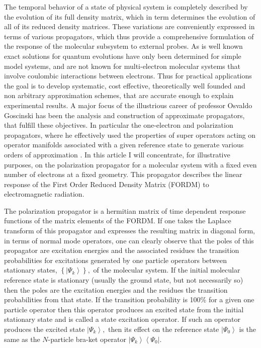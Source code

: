 \documentclass[aps,preprint]{revtex4}%
\begin{document}
The temporal behavior of a state of physical system is completely described by
the evolution of its full density matrix, which in term determines the
evolution of all of its reduced density matrices. These variations are
conveniently expressed in terms of various propagators, which thus provide a
comprehensive formulation of the response of the molecular subsystem to
external probes. As is well known exact solutions for quantum evolutions have
only been determined for simple model systems, and are not known for
multi-electron molecular systems that involve coulombic interactions between
electrons. Thus for practical applications the goal is to develop systematic,
cost effective, theoretically well founded and non arbitrary approximation
schemes, that are accurate enough to explain experimental results. A major
focus of the illustrious career of professor Osvaldo Goscinski has been the
analysis and construction of approximate propagators, that fulfill these
objectives. In particular the one-electron and polarization propagators, where
he effectively used the properties of super operators acting on operator
manifolds associated with a given reference state to generate various orders
of approximation \cite{Goscinski73}\cite{Pickup73}\cite{Goscinski69}%
\cite{Goscinski70}\cite{Weiner80a}\cite{Goscinski80}\cite{Howat77a}. In this
article I will concentrate, for illustrative purposes, on the polarization
propagator for a molecular system with a fixed even number of electrons at a
fixed geometry. This propagator describes the linear response of the First
Order Reduced Density Matrix (FORDM) to electromagnetic radiation.

The polarization propagator is a hermitian matrix of time dependent response
functions of the matrix elements of the FORDM. If one takes the Laplace
transform of this propagator and expresses the resulting matrix in diagonal
form, in terms of normal mode operators, one can clearly observe that the
poles of this propagator are excitation energies and the associated residues
the transition probabilities for excitations generated by one particle
operators between stationary states, $\left\{  \left\vert \Psi_{k}%
\right\rangle \right\}  ,$ of the molecular system. If the initial molecular
reference state is stationary (usually the ground state, but not necessarily
so) then the poles are the excitation energies and the residues the transition
probabilities from that state. If the transition probability is 100\% for a
given one particle operator then this operator produces an excited state from
the initial stationary state and is called a state excitation operator. If
such an operator produces the excited state $\left\vert \Psi_{k}\right\rangle
,$ then its effect on the reference state $\left\vert \Psi_{0}\right\rangle $
is the same as the $N$-particle bra-ket operator $\left\vert \Psi
_{k}\right\rangle \left\langle \Psi_{0}\right\vert .$
\end{document}
